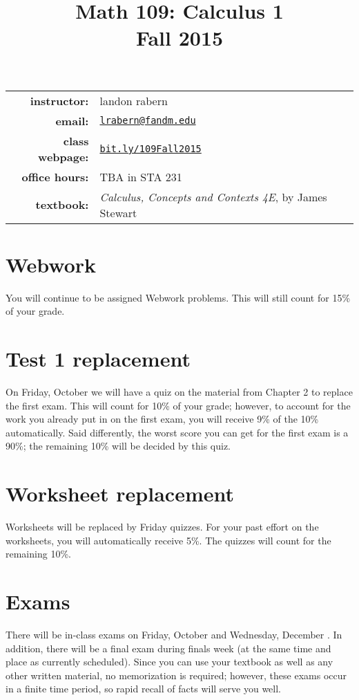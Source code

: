 \documentclass[10pt]{article}
\title{Math 109: Calculus 1\\ \bigskip\small{Fall 2015}}
\date{}
\begin{document}
\maketitle

\begin{tabular}{r l}
\textbf{instructor:}& landon rabern\\
\textbf{email:}& \href{mailto:lrabern@fandm.edu}{\nolinkurl{lrabern@fandm.edu}}\\
\textbf{class webpage:}& \href{http://bit.ly/109Fall2015}{\nolinkurl{bit.ly/109Fall2015}}\\
\textbf{office hours:}& TBA in STA 231\\
\textbf{textbook:}&\textit{Calculus, Concepts and Contexts 4E}, by James Stewart\\
\end{tabular}

\section*{Webwork} 
You will continue to be assigned Webwork problems. This will still count for 15\% of your grade.
\section*{Test 1 replacement}
On Friday, October  we will have a quiz on the material from Chapter 2 to replace the first exam. This will count for 10\% of your grade; however, to account for the work you already put in on the first exam, you will receive 9\% of the 10\% automatically.  Said differently, the worst score you can get for the first exam is a 90\%; the remaining 10\% will be decided by this quiz.

\section*{Worksheet replacement}
Worksheets will be replaced by Friday quizzes. For your past effort on the worksheets, you will automatically receive 5\%.  The quizzes will count for the remaining 10\%.

\section*{Exams}
There will be in-class exams on Friday, October  and Wednesday, December .  In addition, there will be a final exam during finals week (at the same time and place as currently scheduled).
Since you can use your textbook as well as any other written material, no memorization is required; however, these exams occur in a finite time period, so rapid recall of facts will serve you well. 
\end{document}
